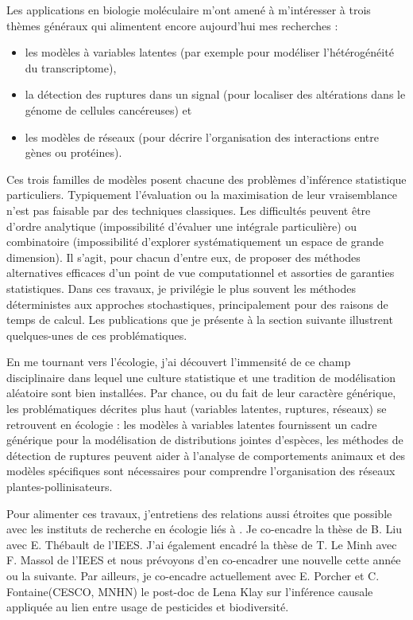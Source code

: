 Les applications en biologie moléculaire m’ont amené à m’intéresser à trois thèmes généraux qui alimentent encore aujourd'hui mes recherches : 
\begin{itemize} 
\item les modèles à variables latentes (par exemple pour modéliser l’hétérogénéité du transcriptome), 
\item la détection des ruptures dans un signal (pour localiser des altérations dans le génome de cellules cancéreuses) et 
\item les modèles de réseaux (pour décrire l’organisation des interactions entre gènes ou protéines).
\end{itemize} 
Ces trois familles de modèles posent chacune des problèmes d’inférence statistique particuliers. Typiquement l’évaluation ou la maximisation de leur vraisemblance n’est pas faisable par des techniques classiques. Les difficultés peuvent être d'ordre analytique (impossibilité d’évaluer une intégrale particulière) ou combinatoire (impossibilité d’explorer systématiquement un espace de grande dimension). Il s’agit, pour chacun d’entre eux, de proposer des méthodes alternatives efficaces d’un point de vue computationnel et assorties de garanties statistiques. Dans ces travaux, je privilégie le plus souvent les méthodes déterministes aux approches stochastiques, principalement pour des raisons de temps de calcul. Les publications que je présente à la section suivante illustrent quelques-unes de ces problématiques.

\bigskip
En me tournant vers l’écologie, j’ai découvert l’immensité de ce champ disciplinaire dans lequel une culture statistique et une tradition de modélisation aléatoire sont bien installées. Par chance, ou du fait de leur caractère générique, les problématiques décrites plus haut (variables latentes, ruptures, réseaux) se retrouvent en écologie : les modèles à variables latentes fournissent un cadre générique pour la modélisation de distributions jointes d’espèces, les méthodes de détection de ruptures peuvent aider à l’analyse de comportements animaux et des modèles spécifiques sont nécessaires pour comprendre l’organisation des réseaux plantes-pollinisateurs. 

Pour alimenter ces travaux, j’entretiens des relations aussi étroites que possible avec les instituts de recherche en écologie liés à \SU. Je co-encadre la thèse de B. Liu avec E. Thébault de l’IEES. J’ai également encadré la thèse de T. Le Minh avec F. Massol de l’IEES et nous prévoyons d’en co-encadrer une nouvelle cette année ou la suivante. Par ailleurs, je co-encadre actuellement avec E. Porcher et C. Fontaine(CESCO, MNHN) le post-doc de Lena Klay sur l’inférence causale appliquée au lien entre usage de pesticides et biodiversité. 

